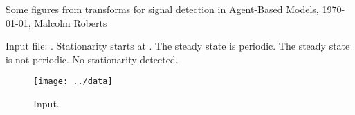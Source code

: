 \documentclass[a4paper]{article}
\newcommand{\thetitle}{Some figures from transforms for signal
  detection in Agent-Based Models}
\newcommand{\theauthor}{Malcolm Roberts}
\begin{document}
\begin{center}
  \thetitle{}, \today, \theauthor{}
\end{center}




%
%




           {}
           {}



           {}
           {}

Input file: \texttt{\filename}. %
%
       {Stationarity starts at \startval{}.%
       {The steady state is periodic.}%
       {The steady state is not periodic.}
}%
       {No stationarity detected.} %

\begin{figure}[htbp]
  \begin{center}        
    \texttt{[image: ../data]}
    \caption{Input.}
  \end{center}
\end{figure}
\end{document}
